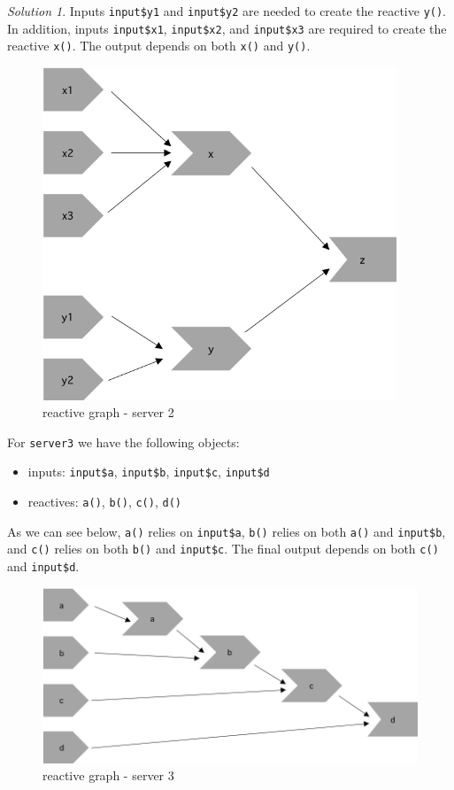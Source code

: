 \documentclass[
]{book}
\providecommand{\tightlist}{%
  \setlength{\itemsep}{0pt}\setlength{\parskip}{0pt}}
\theoremstyle{definition}
\theoremstyle{definition}
\theoremstyle{definition}
\theoremstyle{definition}
\theoremstyle{remark}
\newtheorem*{solution}{Solution}
\begin{document}
\begin{solution}
Inputs \texttt{input\$y1} and \texttt{input\$y2} are needed to create the reactive \texttt{y()}. In
addition, inputs \texttt{input\$x1}, \texttt{input\$x2}, and \texttt{input\$x3} are required to create
the reactive \texttt{x()}. The output depends on both \texttt{x()} and \texttt{y()}.

\begin{figure}
\centering
\includegraphics[width=4.16667in,height=\textheight]{images/4.3.6.1-s2.png}
\caption{reactive graph - server 2}
\end{figure}

For \texttt{server3} we have the following objects:

\begin{itemize}
\tightlist
\item
  inputs: \texttt{input\$a}, \texttt{input\$b}, \texttt{input\$c}, \texttt{input\$d}
\item
  reactives: \texttt{a()}, \texttt{b()}, \texttt{c()}, \texttt{d()}
\end{itemize}

As we can see below, \texttt{a()} relies on \texttt{input\$a}, \texttt{b()} relies on both \texttt{a()} and
\texttt{input\$b}, and \texttt{c()} relies on both \texttt{b()} and \texttt{input\$c}. The final output
depends on both \texttt{c()} and \texttt{input\$d}.

\begin{figure}
\centering
\includegraphics[width=6.25in,height=\textheight]{images/4.3.6.1-s3.png}
\caption{reactive graph - server 3}
\end{figure}

\end{solution}
\end{document}
